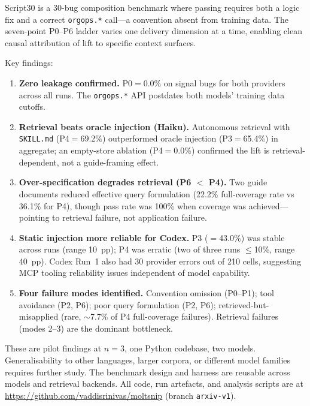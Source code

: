 \documentclass[10pt,a4paper,twocolumn]{article}
\begin{document}
Script30 is a 30-bug composition benchmark where passing requires both a logic fix and a correct \texttt{orgops.*} call---a convention absent from training data. The seven-point P0--P6 ladder varies one delivery dimension at a time, enabling clean causal attribution of lift to specific context surfaces.

Key findings:

\begin{enumerate}
    \item \textbf{Zero leakage confirmed.} P0$=$0.0\% on signal bugs for both providers across all runs. The \texttt{orgops.*} API postdates both models' training data cutoffs.

    \item \textbf{Retrieval beats oracle injection (Haiku).} Autonomous retrieval with \texttt{SKILL.md} (P4$=$69.2\%) outperformed oracle injection (P3$=$65.4\%) in aggregate; an empty-store ablation (P4$=$0.0\%) confirmed the lift is retrieval-dependent, not a guide-framing effect.

    \item \textbf{Over-specification degrades retrieval (P6 $<$ P4).} Two guide documents reduced effective query formulation (22.2\% full-coverage rate vs 36.1\% for P4), though pass rate was 100\% when coverage was achieved---pointing to retrieval failure, not application failure.

    \item \textbf{Static injection more reliable for Codex.} P3 ($=$43.0\%) was stable across runs (range 10~pp); P4 was erratic (two of three runs $\leq$10\%, range 40~pp). Codex Run~1 also had 30 provider errors out of 210 cells, suggesting MCP tooling reliability issues independent of model capability.

    \item \textbf{Four failure modes identified.} Convention omission (P0--P1); tool avoidance (P2, P6); poor query formulation (P2, P6); retrieved-but-misapplied (rare, $\sim$7.7\% of P4 full-coverage failures). Retrieval failures (modes 2--3) are the dominant bottleneck.
\end{enumerate}

These are pilot findings at $n{=}3$, one Python codebase, two models. Generalisability to other languages, larger corpora, or different model families requires further study. The benchmark design and harness are reusable across models and retrieval backends. All code, run artefacts, and analysis scripts are at \url{https://github.com/vaddisrinivas/moltsnip} (branch \texttt{arxiv-v1}).
\end{document}
